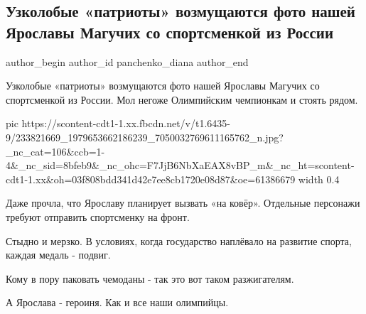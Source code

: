  
 
 
 
 
 
\subsection{Узколобые «патриоты» возмущаются фото нашей Ярославы Магучих со спортсменкой из России}
\label{sec:08_08_2021.fb.panchenko_diana.1.maguchih_jaroslava_foto}
 
\ifcmt
 author_begin
   author_id panchenko_diana
 author_end
\fi

Узколобые «патриоты» возмущаются фото нашей Ярославы Магучих со спортсменкой из
России. Мол негоже Олимпийским чемпионкам и стоять рядом. 

\ifcmt
  pic https://scontent-cdt1-1.xx.fbcdn.net/v/t1.6435-9/233821669_1979653662186239_7050032769611165762_n.jpg?_nc_cat=106&ccb=1-4&_nc_sid=8bfeb9&_nc_ohc=F7JjB6NbXaEAX8vBP_m&_nc_ht=scontent-cdt1-1.xx&oh=03f808bdd341d42e7ee8cb1720e08d87&oe=61386679
  width 0.4
\fi

Даже прочла, что Ярославу планирует вызвать «на ковёр». Отдельные персонажи
требуют отправить спортсменку на фронт. 

Стыдно и мерзко. В условиях, когда государство наплёвало на развитие спорта,
каждая медаль - подвиг.

Кому в пору паковать чемоданы - так это вот таком разжигателям. 

А Ярослава - героиня. Как и все наши олимпийцы.
